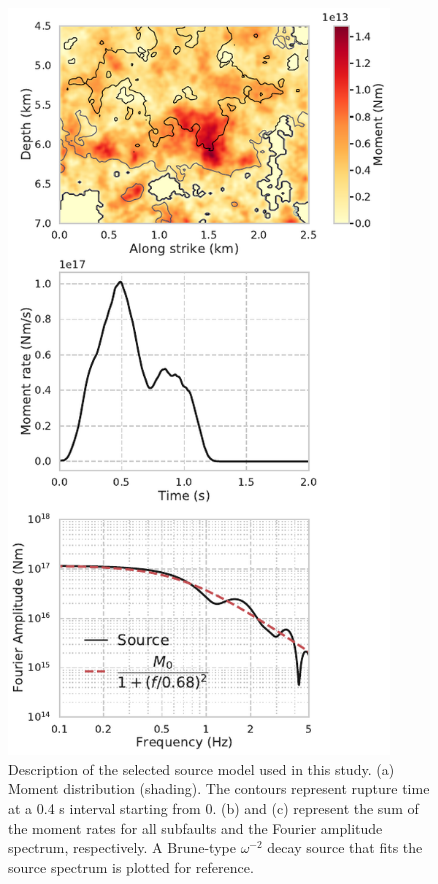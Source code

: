 \clearpage
\begin{figure}[!ht]
  \centering
  \includegraphics[width=0.9\textwidth,height=0.86\textheight,keepaspectratio]{figures/figure_vs30_2.pdf}
  \caption{Description of the selected source model used in this study. (a) Moment distribution (shading). The contours represent rupture time at a 0.4 s interval starting from 0. (b) and (c) represent the sum of the moment rates for all subfaults and the Fourier amplitude spectrum, respectively. A Brune-type $\omega^{-2}$ decay source \citep{brune1970tectonic} that fits the source spectrum is plotted for reference.}
  \label{fig:vs30-2}
\end{figure}

